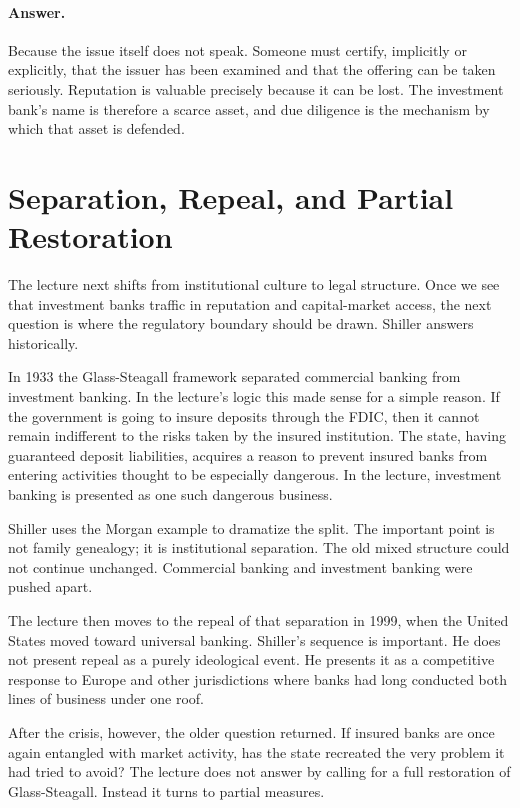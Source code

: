 \paragraph{Answer.} Because the issue itself does not speak. Someone must certify, implicitly or explicitly, that the issuer has been examined and that the offering can be taken seriously. Reputation is valuable precisely because it can be lost. The investment bank's name is therefore a scarce asset, and due diligence is the mechanism by which that asset is defended.

\section{Separation, Repeal, and Partial Restoration}

The lecture next shifts from institutional culture to legal structure. Once we see that investment banks traffic in reputation and capital-market access, the next question is where the regulatory boundary should be drawn. Shiller answers historically.

In 1933 the Glass-Steagall framework separated commercial banking from investment banking. In the lecture's logic this made sense for a simple reason. If the government is going to insure deposits through the FDIC, then it cannot remain indifferent to the risks taken by the insured institution. The state, having guaranteed deposit liabilities, acquires a reason to prevent insured banks from entering activities thought to be especially dangerous. In the lecture, investment banking is presented as one such dangerous business.

Shiller uses the Morgan example to dramatize the split. The important point is not family genealogy; it is institutional separation. The old mixed structure could not continue unchanged. Commercial banking and investment banking were pushed apart.

The lecture then moves to the repeal of that separation in 1999, when the United States moved toward universal banking. Shiller's sequence is important. He does not present repeal as a purely ideological event. He presents it as a competitive response to Europe and other jurisdictions where banks had long conducted both lines of business under one roof.

After the crisis, however, the older question returned. If insured banks are once again entangled with market activity, has the state recreated the very problem it had tried to avoid? The lecture does not answer by calling for a full restoration of Glass-Steagall. Instead it turns to partial measures.

